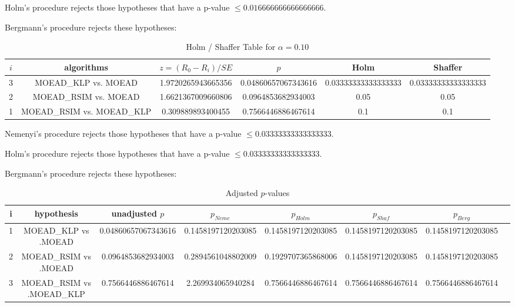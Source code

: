 \documentclass[a4paper,10pt]{article}
\begin{document}
\begin{landscape}
Holm's procedure rejects those hypotheses that have a p-value $\le0.016666666666666666$.


Bergmann's procedure rejects these hypotheses:


\begin{itemize}


\end{itemize}


\begin{table}[!htp]
\centering\tiny
\caption{Holm / Shaffer Table for $\alpha=0.10$}
\begin{tabular}{cccccc}
$i$&algorithms&$z=(R_0 - R_i)/SE$&$p$&Holm&Shaffer\\
\hline
3&MOEAD_KLP vs. MOEAD&1.9720265943665356&0.04860657067343616&0.03333333333333333&0.03333333333333333\\
2&MOEAD_RSIM vs. MOEAD&1.6621367009660806&0.0964853682934003&0.05&0.05\\
1&MOEAD_RSIM vs. MOEAD_KLP&0.309889893400455&0.7566446886467614&0.1&0.1\\
\hline
\end{tabular}
\end{table}
Nemenyi's procedure rejects those hypotheses that have a p-value $\le0.03333333333333333$.


Holm's procedure rejects those hypotheses that have a p-value $\le0.03333333333333333$.


Bergmann's procedure rejects these hypotheses:


\begin{itemize}


\end{itemize}


\begin{table}[!htp]
\centering\tiny
\caption{Adjusted $p$-values}
\begin{tabular}{cccccccc}
i&hypothesis&unadjusted $p$&$p_{Neme}$&$p_{Holm}$&$p_{Shaf}$&$p_{Berg}$\\
\hline
1&MOEAD_KLP vs .MOEAD&0.04860657067343616&0.1458197120203085&0.1458197120203085&0.1458197120203085&0.1458197120203085\\
2&MOEAD_RSIM vs .MOEAD&0.0964853682934003&0.2894561048802009&0.1929707365868006&0.1458197120203085&0.1458197120203085\\
3&MOEAD_RSIM vs .MOEAD_KLP&0.7566446886467614&2.269934065940284&0.7566446886467614&0.7566446886467614&0.7566446886467614\\
\hline
\end{tabular}
\end{table}

\end{landscape}
\end{document}
